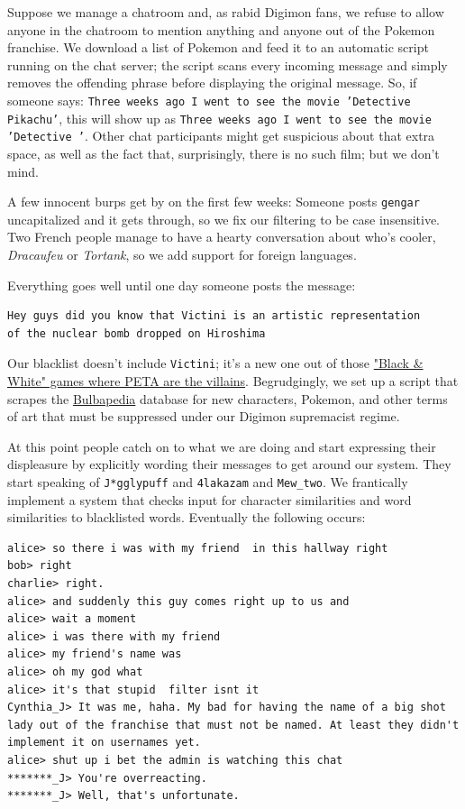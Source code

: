 \documentclass{article}
\newcommand{\code}[1]{\colorbox{ubuntuback}{\texttt{#1}}}
\begin{document}
Suppose we manage a chatroom and, as rabid Digimon fans, we refuse to allow anyone in the chatroom to mention anything and anyone out of the Pokemon franchise. We download a list of Pokemon and feed it to an automatic script running on the chat server; the script scans every incoming message and simply removes the offending phrase before displaying the original message. So, if someone says: \code{Three weeks ago I went to see the movie 'Detective Pikachu'}, this will show up as \code{Three weeks ago I went to see the movie 'Detective '}. Other chat participants might get suspicious about that extra space, as well as the fact that, surprisingly, there is no such film; but we don't mind.

A few innocent burps get by on the first few weeks: Someone posts \code{gengar} uncapitalized and it gets through, so we fix our filtering to be case insensitive. Two French people manage to have a hearty conversation about who's cooler, \textit{Dracaufeu} or \textit{Tortank}, so we add support for foreign languages.

Everything goes well until one day someone posts the message: 

\begin{lstlisting}
Hey guys did you know that Victini is an artistic representation 
of the nuclear bomb dropped on Hiroshima
\end{lstlisting}

Our blacklist doesn't include \code{Victini}; it's a new one out of those \href{https://www.geek.com/games/peta-says-pokemon-encourages-animal-abuse-1520951/}{"Black \& White" games where PETA are the villains}. Begrudgingly, we set up a script that scrapes the \href{https://bulbapedia.bulbagarden.net}{Bulbapedia} database for new characters, Pokemon, and other terms of art that must be suppressed under our Digimon supremacist regime.

At this point people catch on to what we are doing and start expressing their displeasure by explicitly wording their messages to get around our system. They start speaking of \code{J*gglypuff} and \code{4lakazam} and \code{Mew\_two}. We frantically implement a system that checks input for character similarities and word similarities to blacklisted words. Eventually the following occurs:

\begin{lstlisting}
alice> so there i was with my friend  in this hallway right
bob> right
charlie> right.
alice> and suddenly this guy comes right up to us and
alice> wait a moment
alice> i was there with my friend 
alice> my friend's name was 
alice> oh my god what
alice> it's that stupid  filter isnt it
Cynthia_J> It was me, haha. My bad for having the name of a big shot lady out of the franchise that must not be named. At least they didn't implement it on usernames yet.
alice> shut up i bet the admin is watching this chat
*******_J> You're overreacting.
*******_J> Well, that's unfortunate.
\end{lstlisting}
\end{document}

